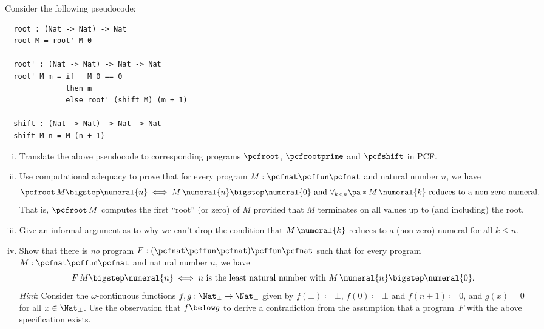 \begin{exercise}\label{exer:finding-roots}
  Consider the following pseudocode:

\begin{verbatim}
  root : (Nat -> Nat) -> Nat
  root M = root' M 0

  root' : (Nat -> Nat) -> Nat -> Nat
  root' M m = if   M 0 == 0
              then m
              else root' (shift M) (m + 1)

  shift : (Nat -> Nat) -> Nat -> Nat
  shift M n = M (n + 1)
\end{verbatim}
  \begin{enumerate}[(i), itemsep=5pt]
  \item Translate the above pseudocode to corresponding programs \(\pcfroot\),
    \(\pcfrootprime\) and \(\pcfshift\) in PCF.
  \item Use computational adequacy to prove that for every program
    \(M : \pcfnat \pcffun \pcfnat\) and natural number \(n\), we have
    \[
      \pcfroot\,M \bigstep \numeral{n} \iff %
      M \, \numeral{n} \bigstep \numeral{0} \text{ and } %
      \forall_{k < n}\pa*{M \, \numeral{k} \text{ reduces to a non-zero numeral}}.
     \]
     That is, \(\pcfroot \, M\) computes the first ``root'' (or zero) of \(M\)
     provided that \(M\) terminates on all values up to (and including) the
     root.
   \item Give an informal argument as to why we can't drop the condition that
     \(M \, \numeral{k}\) reduces to a (non-zero) numeral for all \(k \leq n\).
   \item Show that there is \emph{no} program
     \(F : (\pcfnat \pcffun \pcfnat) \pcffun \pcfnat\) such that
     for every program \(M : \pcfnat \pcffun \pcfnat\) and natural number \(n\),
     we have
     \[
       F\,M \bigstep \numeral{n} \iff %
       n \text{ is the least natural number with } M \, \numeral{n} \bigstep \numeral{0}.
     \]
     \emph{Hint}: Consider the \(\omega\)-continuous functions
     \(f,g : \Nat_\bot \to \Nat_\bot \) given by \(f(\bot) \coloneqq \bot\),
     \(f(0) \coloneqq \bot\) and \(f(n+1) \coloneqq 0\), and \(g(x) = 0\) for
     all \(x \in \Nat_\bot\).
     Use the observation that \(f \below g\) to derive a contradiction from the
     assumption that a program~\(F\) with the above specification exists.
     \qedhere
  \end{enumerate}
\end{exercise}

